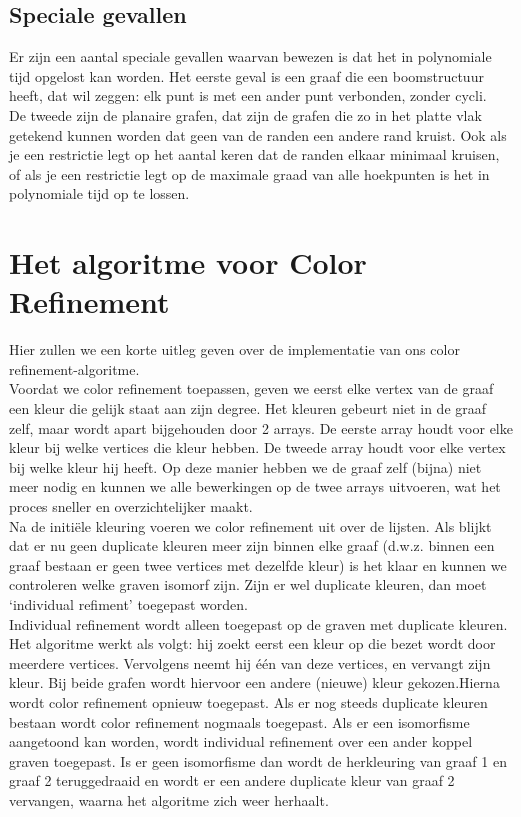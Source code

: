 \documentclass{article}
\begin{document}
\subsection{Speciale gevallen}
Er zijn een aantal speciale gevallen waarvan bewezen is dat het in polynomiale tijd opgelost kan worden. Het eerste geval is een graaf die een boomstructuur heeft, dat wil zeggen: elk punt is met een ander punt verbonden, zonder cycli.\\
De tweede zijn de planaire grafen, dat zijn de grafen die zo in het platte vlak getekend kunnen worden dat geen van de randen een andere rand kruist. Ook als je een restrictie legt op het aantal keren dat de randen elkaar minimaal kruisen, of als je een restrictie legt op de maximale graad van alle hoekpunten is het in polynomiale tijd op te lossen.
\pagebreak


\section{Het algoritme voor Color Refinement}
Hier zullen we een korte uitleg geven over de implementatie van ons color refinement-algoritme.\\

Voordat we color refinement toepassen, geven we eerst elke vertex van de graaf een kleur die gelijk staat aan zijn degree. Het kleuren gebeurt niet in de graaf zelf, maar wordt apart bijgehouden door 2 arrays. De eerste array houdt voor elke kleur bij welke vertices die kleur hebben. De tweede array houdt voor elke vertex bij welke kleur hij heeft. Op deze manier hebben we de graaf zelf (bijna) niet meer nodig en kunnen we alle bewerkingen op de twee arrays uitvoeren, wat het proces sneller en overzichtelijker maakt.\\
Na de initi\"ele kleuring voeren we color refinement uit over de lijsten. Als blijkt dat er nu geen duplicate kleuren meer zijn binnen elke graaf (d.w.z. binnen een graaf bestaan er geen twee vertices met dezelfde kleur) is het klaar en kunnen we controleren welke graven isomorf zijn. Zijn er wel duplicate kleuren, dan moet `individual refiment' toegepast worden.\\

Individual refinement wordt alleen toegepast op de graven met duplicate kleuren. Het algoritme werkt als volgt: hij zoekt eerst een kleur op die bezet wordt door meerdere vertices. Vervolgens neemt hij \'e\'en van deze vertices, en vervangt zijn kleur. Bij beide grafen wordt hiervoor een andere (nieuwe) kleur gekozen.Hierna wordt color refinement opnieuw toegepast. Als er nog steeds duplicate kleuren bestaan wordt color refinement nogmaals toegepast. Als er een isomorfisme aangetoond kan worden, wordt individual refinement over een ander koppel graven toegepast. Is er geen isomorfisme dan wordt de herkleuring van graaf 1 en graaf 2 teruggedraaid en wordt er een andere duplicate kleur van graaf 2 vervangen, waarna het algoritme zich weer herhaalt. 
\pagebreak
\end{document}
